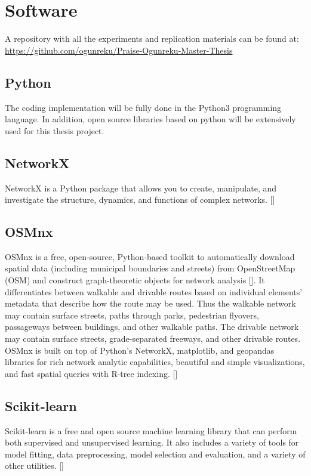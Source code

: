 \section{Software}
A repository with all the experiments and replication materials can be found at: \url{https://github.com/ogunreku/Praise-Ogunreku-Master-Thesis}

\subsection{Python}
The coding implementation will be fully done in the Python3 programming language. In addition, open source libraries based on python will be extensively used for this thesis project.

\subsection{NetworkX}
NetworkX is a Python package that allows you to create, manipulate, and investigate the structure, dynamics, and functions of complex networks. [\cite{Hagberg:2008}]

\subsection{OSMnx}
OSMnx is a free, open-source, Python-based toolkit to automatically download spatial data (including municipal boundaries and streets) from OpenStreetMap (OSM) and construct graph-theoretic objects for network analysis [\cite{Boeing:2017}]. It differentiates between walkable and drivable routes based on individual elements’ metadata that describe how the route may be used. Thus the walkable network may contain surface streets, paths through parks, pedestrian flyovers, passageways between buildings, and other walkable paths. The drivable network may contain surface streets, grade-separated freeways, and other drivable routes. OSMnx is built on top of Python's NetworkX, matplotlib, and geopandas libraries for rich network analytic capabilities, beautiful and simple visualizations, and fast spatial queries with R-tree indexing. [\cite{Boeing:2017}]

\subsection{Scikit-learn}
Scikit-learn is a free and open source machine learning library that can perform both supervised and unsupervised learning. It also includes a variety of tools for model fitting, data preprocessing, model selection and evaluation, and a variety of other utilities. [\cite{scikit-learn}]

